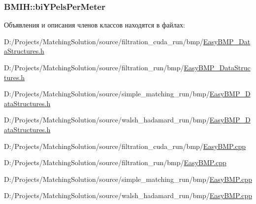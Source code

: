 \hypertarget{class_b_m_i_h_933d1de74ec3e28cad20e83ca5751319}{
\subsubsection[{biYPelsPerMeter}]{ {\bf BMIH::biYPelsPerMeter}}}
\label{class_b_m_i_h_933d1de74ec3e28cad20e83ca5751319}




Объявления и описания членов классов находятся в файлах:\begin{CompactItemize}
\item 
D:/Projects/MatchingSolution/source/filtration\_\-cuda\_\-run/bmp/\hyperlink{filtration__cuda__run_2bmp_2_easy_b_m_p___data_structures_8h}{EasyBMP\_\-DataStructures.h}\item 
D:/Projects/MatchingSolution/source/filtration\_\-run/bmp/\hyperlink{filtration__run_2bmp_2_easy_b_m_p___data_structures_8h}{EasyBMP\_\-DataStructures.h}\item 
D:/Projects/MatchingSolution/source/simple\_\-matching\_\-run/bmp/\hyperlink{simple__matching__run_2bmp_2_easy_b_m_p___data_structures_8h}{EasyBMP\_\-DataStructures.h}\item 
D:/Projects/MatchingSolution/source/walsh\_\-hadamard\_\-run/bmp/\hyperlink{walsh__hadamard__run_2bmp_2_easy_b_m_p___data_structures_8h}{EasyBMP\_\-DataStructures.h}\item 
D:/Projects/MatchingSolution/source/filtration\_\-cuda\_\-run/bmp/\hyperlink{filtration__cuda__run_2bmp_2_easy_b_m_p_8cpp}{EasyBMP.cpp}\item 
D:/Projects/MatchingSolution/source/filtration\_\-run/bmp/\hyperlink{filtration__run_2bmp_2_easy_b_m_p_8cpp}{EasyBMP.cpp}\item 
D:/Projects/MatchingSolution/source/simple\_\-matching\_\-run/bmp/\hyperlink{simple__matching__run_2bmp_2_easy_b_m_p_8cpp}{EasyBMP.cpp}\item 
D:/Projects/MatchingSolution/source/walsh\_\-hadamard\_\-run/bmp/\hyperlink{walsh__hadamard__run_2bmp_2_easy_b_m_p_8cpp}{EasyBMP.cpp}\end{CompactItemize}
